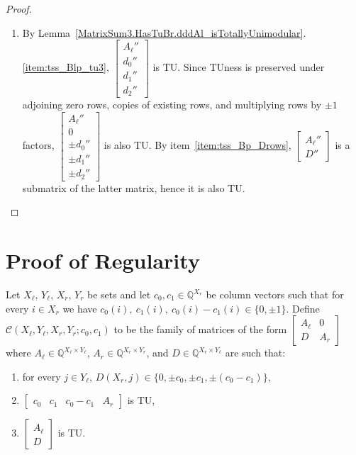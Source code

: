 \begin{proof}
\begin{enumerate}
        \item By Lemma~\ref{MatrixSum3.HasTuBr.dddAl_isTotallyUnimodular}.\ref{item:tss_Blp_tu3}, $\begin{bmatrix} A_{\ell}'' \\ d_{0}'' \\ d_{1}'' \\ d_{2}'' \end{bmatrix}$ is TU. Since TUness is preserved under adjoining zero rows, copies of existing rows, and multiplying rows by $\pm 1$ factors, $\begin{bmatrix} A_{\ell}'' \\ 0 \\ \pm d_{0}'' \\ \pm d_{1}'' \\ \pm d_{2}'' \end{bmatrix}$ is also TU. By item~\ref{item:tss_Bp_Drows}, $\begin{bmatrix} A_{\ell}'' \\ D'' \end{bmatrix}$ is a submatrix of the latter matrix, hence it is also TU.
    \end{enumerate}
\end{proof}


\section{Proof of Regularity}

\begin{definition}
    \label{MatrixLikeSum3}
    \leanok
    Let $X_{\ell}$, $Y_{\ell}$, $X_{r}$, $Y_{r}$ be sets and let $c_{0}, c_{1} \in \mathbb{Q}^{X_{r}}$ be column vectors such that for every $i \in X_{r}$ we have $c_{0} (i), \ c_{1} (i), \ c_{0} (i) - c_{1} (i) \in \{0, \pm 1\}$. Define $\mathcal{C} (X_{\ell}, Y_{\ell}, X_{r}, Y_{r}; c_{0}, c_{1})$ to be the family of matrices of the form $\begin{bmatrix} A_{\ell} & 0 \\ D & A_{r} \end{bmatrix}$ where $A_{\ell} \in \mathbb{Q}^{X_{\ell} \times Y_{\ell}}$, $A_{r} \in \mathbb{Q}^{X_{r} \times Y_{r}}$, and $D \in \mathbb{Q}^{X_{r} \times Y_{\ell}}$ are such that:
    \begin{enumerate}
        \item\label{item:tsl_cols} for every $j \in Y_{\ell}$, $D (X_{r}, j) \in \{0, \pm c_{0}, \pm c_{1}, \pm (c_{0} - c_{1})\}$,
        \item\label{item:tsl_bot} $\begin{bmatrix} c_{0} & c_{1} & c_{0} - c_{1} & A_{r} \end{bmatrix}$ is TU,
        \item\label{item:tsl_left} $\begin{bmatrix} A_{\ell} \\ D \end{bmatrix}$ is TU.
    \end{enumerate}
\end{definition}

